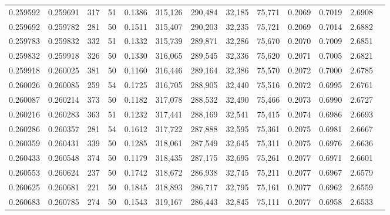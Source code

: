 \begin{tabular}{rrrrrrrrrrrrr}
0.259592 & 0.259691 &   317 &  51 &                                     0.1386 & 315,126 & 290,484 &  32,185 &  75,771 & 0.2069 & 0.7019 & 2.6908 \\
0.259692 & 0.259782 &   281 &  50 &                                     0.1511 & 315,407 & 290,203 &  32,235 &  75,721 & 0.2069 & 0.7014 & 2.6882 \\
0.259783 & 0.259832 &   332 &  51 &                                     0.1332 & 315,739 & 289,871 &  32,286 &  75,670 & 0.2070 & 0.7009 & 2.6851 \\
0.259832 & 0.259918 &   326 &  50 &                                     0.1330 & 316,065 & 289,545 &  32,336 &  75,620 & 0.2071 & 0.7005 & 2.6821 \\
0.259918 & 0.260025 &   381 &  50 &                                     0.1160 & 316,446 & 289,164 &  32,386 &  75,570 & 0.2072 & 0.7000 & 2.6785 \\
0.260026 & 0.260085 &   259 &  54 &                                     0.1725 & 316,705 & 288,905 &  32,440 &  75,516 & 0.2072 & 0.6995 & 2.6761 \\
0.260087 & 0.260214 &   373 &  50 &                                     0.1182 & 317,078 & 288,532 &  32,490 &  75,466 & 0.2073 & 0.6990 & 2.6727 \\
0.260216 & 0.260283 &   363 &  51 &                                     0.1232 & 317,441 & 288,169 &  32,541 &  75,415 & 0.2074 & 0.6986 & 2.6693 \\
0.260286 & 0.260357 &   281 &  54 &                                     0.1612 & 317,722 & 287,888 &  32,595 &  75,361 & 0.2075 & 0.6981 & 2.6667 \\
0.260359 & 0.260431 &   339 &  50 &                                     0.1285 & 318,061 & 287,549 &  32,645 &  75,311 & 0.2075 & 0.6976 & 2.6636 \\
0.260433 & 0.260548 &   374 &  50 &                                     0.1179 & 318,435 & 287,175 &  32,695 &  75,261 & 0.2077 & 0.6971 & 2.6601 \\
0.260553 & 0.260624 &   237 &  50 &                                     0.1742 & 318,672 & 286,938 &  32,745 &  75,211 & 0.2077 & 0.6967 & 2.6579 \\
0.260625 & 0.260681 &   221 &  50 &                                     0.1845 & 318,893 & 286,717 &  32,795 &  75,161 & 0.2077 & 0.6962 & 2.6559 \\
0.260683 & 0.260785 &   274 &  50 &                                     0.1543 & 319,167 & 286,443 &  32,845 &  75,111 & 0.2077 & 0.6958 & 2.6533 \\

\end{tabular}
